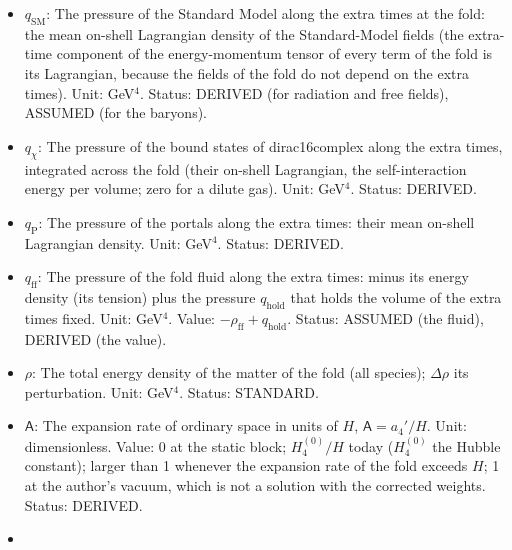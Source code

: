\documentclass[
  10pt,
]{article}
\begin{document}
\begin{itemize}
  \(\lambda_{\mathrm{F}}\): The tension that the static block requires
  of the fold: the total vacuum energy of the seven-dimensional fold,
  made of the tension of the fold fluid and the vacuum energy of the
  fields of the fold (both have the pressure minus their energy density
  along ordinary space and along the extra times), per unit volume of
  ordinary space of the fold (four-dimensional normalisation); the
  excess of that total over \(\lambda_{\mathrm{F}}\) is the dark energy
  \(\rho_\Lambda\). Unit: GeV\(^4\). Value:
  \(32HV_*/(5\kappa) = 6H^2/(8\pi G_{\mathrm{N}})\). Status: DERIVED.
\item
  \(q_{\mathrm{SM}}\): The pressure of the Standard Model along the
  extra times at the fold: the mean on-shell Lagrangian density of the
  Standard-Model fields (the extra-time component of the energy-momentum
  tensor of every term of the fold is its Lagrangian, because the fields
  of the fold do not depend on the extra times). Unit: GeV\(^4\).
  Status: DERIVED (for radiation and free fields), ASSUMED (for the
  baryons).
\item
  \(q_\chi\): The pressure of the bound states of dirac16complex along
  the extra times, integrated across the fold (their on-shell
  Lagrangian, the self-interaction energy per volume; zero for a dilute
  gas). Unit: GeV\(^4\). Status: DERIVED.
\item
  \(q_{\mathrm{P}}\): The pressure of the portals along the extra times:
  their mean on-shell Lagrangian density. Unit: GeV\(^4\). Status:
  DERIVED.
\item
  \(q_{\mathrm{ff}}\): The pressure of the fold fluid along the extra
  times: minus its energy density (its tension) plus the pressure
  \(q_{\mathrm{hold}}\) that holds the volume of the extra times fixed.
  Unit: GeV\(^4\). Value: \(-\rho_{\mathrm{ff}} + q_{\mathrm{hold}}\).
  Status: ASSUMED (the fluid), DERIVED (the value).
\item
  \(\rho\): The total energy density of the matter of the fold (all
  species); \(\Delta\rho\) its perturbation. Unit: GeV\(^4\). Status:
  STANDARD.
\item
  \(\mathsf{A}\): The expansion rate of ordinary space in units of
  \(H\), \(\mathsf{A} = a_4'/H\). Unit: dimensionless. Value: 0 at the
  static block; \(H_4^{(0)}/H\) today (\(H_4^{(0)}\) the Hubble
  constant); larger than 1 whenever the expansion rate of the fold
  exceeds \(H\); 1 at the author's vacuum, which is not a solution with
  the corrected weights. Status: DERIVED.
\item

\end{itemize}
\end{document}
